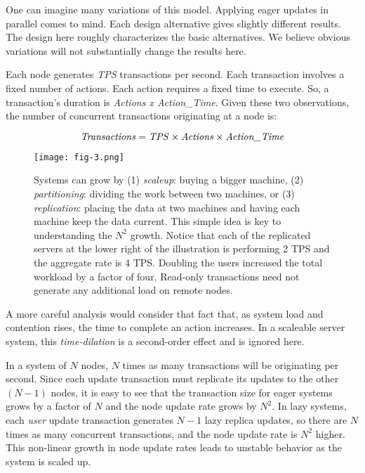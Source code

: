 \documentclass[a4paper,11pt,twoside,openright]{article}
\begin{document}
One can imagine many variations of this model. Applying eager updates in
parallel comes to mind. Each design alternative gives slightly different
results. The design here roughly characterizes the basic alternatives.
We believe obvious variations will not substantially change the results
here.

Each node generates \emph{TPS} transactions per second. Each transaction
involves a fixed number of actions. Each action requires a fixed time to
execute. So, a transaction's duration is \emph{Actions x Action\_Time}.
Given these two observations, the number of concurrent transactions
originating at a node is:

\begin{equation}
\text{\emph{Transactions}} = \text{\emph{TPS}} \times \text{\emph{Actions}} \times \text{\emph{Action\_Time}}
\end{equation}

\begin{figure}
  \centering
  \texttt{[image: fig-3.png]}
  \caption{Systems can grow by (1) \emph{scaleup}: buying a bigger
machine, (2) \emph{partitioning}: dividing the work between two
machines, or (3) \emph{replication}: placing the data at two machines
and having each machine keep the data current. This simple idea is key
to understanding the \(N^2\) growth. Notice that
each of the replicated servers at the lower right of the illustration is
performing 2 TPS and the aggregate rate is 4 TPS. Doubling the users
increased the total workload by a factor of four. Read-only transactions
need not generate any additional load on remote nodes.}
\end{figure}

A more careful analysis would consider that fact that, as system load
and contention rises, the time to complete an action increases. In a
scaleable server system, this \emph{time-dilation} is a second-order
effect and is ignored here.

In a system of \(N\) nodes, \(N\) times as many transactions will
be originating per second. Since each update transaction must replicate
its updates to the other \((N - 1)\) nodes, it is easy to see that the
transaction size for eager systems grows by a factor of \(N\) and the
node update rate grows by \(N^2\). In lazy systems,
each \emph{user} update transaction generates \(N - 1\) lazy replica
updates, so there are \(N\) times as many concurrent transactions,
and the node update rate is \(N^2\) higher. This
non-linear growth in node update rates leads to unstable behavior as the
system is scaled up.
\end{document}
